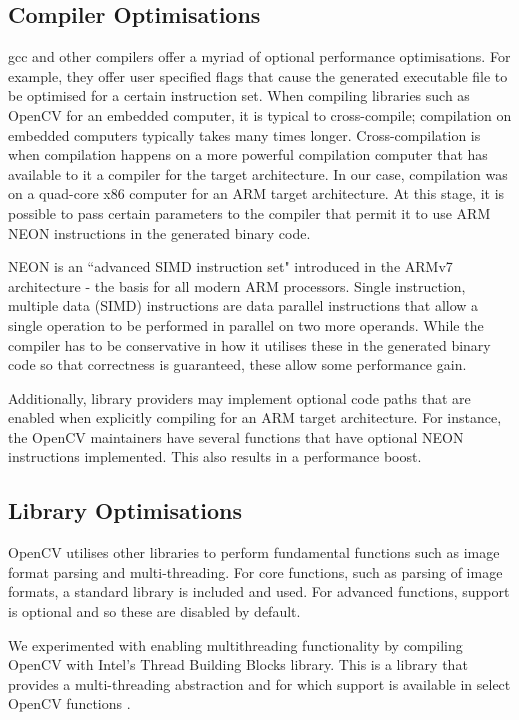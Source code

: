 \documentclass{acm_proc_article-sp}
\begin{document}
\subsection{Compiler Optimisations \label{sec:compiler-opt}}
gcc and other compilers offer a myriad of optional performance optimisations. For example, they offer user specified flags that cause the generated executable file to be optimised for a certain instruction set. When compiling libraries such as OpenCV for an embedded computer, it is typical to cross-compile; compilation on embedded computers typically takes many times longer. Cross-compilation is when compilation happens on a more powerful compilation computer that has available to it a compiler for the target architecture. In our case, compilation was on a quad-core x86 computer for an ARM target architecture. At this stage, it is possible to pass certain parameters to the compiler that permit it to use ARM NEON instructions in the generated binary code.

NEON is an ``advanced SIMD instruction set" introduced in the ARMv7 architecture - the basis for all modern ARM processors. Single instruction, multiple data (SIMD) instructions are data parallel instructions that allow a single operation to be performed in parallel on two more operands. While the compiler has to be conservative in how it utilises these in the generated binary code so that correctness is guaranteed, these allow some performance gain.

Additionally, library providers may implement optional code paths that are enabled when explicitly compiling for an ARM target architecture. For instance, the OpenCV maintainers have several functions that have optional NEON instructions implemented. This also results in a performance boost.

\subsection{Library Optimisations}
OpenCV utilises other libraries to perform fundamental functions such as image format parsing and multi-threading. For core functions, such as parsing of image formats, a standard library is included and used. For advanced functions, support is optional and so these are disabled by default. 

We experimented with enabling multithreading functionality by compiling OpenCV with Intel's Thread Building Blocks library. This is a library that provides a multi-threading abstraction and for which support is available in select OpenCV functions \cite{opencvtbb}.
\end{document}
